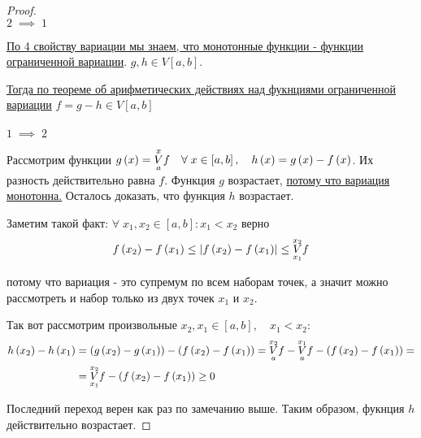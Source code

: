 \documentclass[../main.tex]{subfiles}
\begin{document}
\begin{proof}
    ~\\
    \( 2\; \boxed{ \implies }\;1\)

    \hyperlink{thm:variatsiya_prop}{По 4 свойству вариации мы знаем, что монотонные функции - функции ограниченной вариации}. \( g,h \in V\left[ a,b\right]\). 

    \hyperlink{thm:variatsiya_arithm}{Тогда по теореме об арифметических действиях над фукнциями ограниченной вариации} \( f=g - h \in V\left[ a,b\right]\)\\
    ~\\
    \( 1\; \boxed{ \implies } \; 2\)

    Рассмотрим функции \( g \left( x\right) = \underset{ a}{\overset{ x}{V}} f\quad \forall \; x \in \left[ a,b\right],\quad h\left( x\right)=g \left( x\right) - f\left( x\right)\). Их разность действительно равна \( f\). Функция \( g\) возрастает, \hyperlink{thm:variatsiya_prop}{потому что вариация монотонна.}
    Осталось доказать, что функция \( h\) возрастает. 

    Заметим такой факт: \( \forall \; x_1, x_2 \in \left[ a,b\right]: x_1<x_2\) верно 
    \[ f\left( x_2\right)-f \left( x_1\right) \leq \left| f\left( x_2\right)-f\left( x_1\right)\right| \leq \underset{ x_1}{\overset{ x_2}{V}} f\]

    потому что вариация - это супремум по всем наборам точек, а значит можно рассмотреть и набор только из двух точек \( x_1\) и \( x_2\).
    
    Так вот рассмотрим произвольные \( x_2, x_1 \in \left[ a,b\right],\quad x_1<x_2\):
    \begin{equation*}
        \begin{aligned}
             h\left( x_2\right)-h\left( x_1\right)&=\left( g \left( x_2\right)-g \left( x_1\right)\right)- \left( f\left( x_2\right)-f \left( x_1\right)\right)= \underset{ a}{\overset{ x_2}{V}} f- \underset{ a}{\overset{ x_1}{V}} f- \left( f\left( x_2\right)-f \left( x_1\right)\right)=\\
            &= \underset{ x_1}{\overset{ x_2}{V}} f - \left( f\left( x_2\right)-f \left( x_1\right)\right) \geq 0
        \end{aligned}
    \end{equation*}

    Последний переход верен как раз по замечанию выше. Таким образом, фукнция \( h\) действительно возрастает. 
\end{proof}
\end{document}
